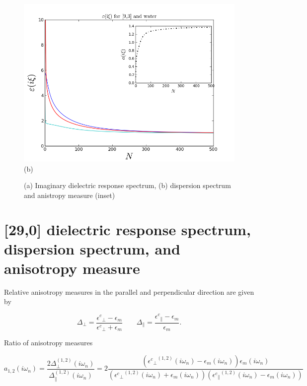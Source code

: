 \documentclass[a4paper]{article}
\begin{document}
\begin{center}
\begin{figure}[t!]
\begin{center}
\begin{minipage}[b]{0.40\textwidth}
\end{minipage}
\hskip 43pt
\begin{minipage}[b]{0.40\textwidth}
\begin{center}
\includegraphics[width=1.4\textwidth]{prop_plots/93w93_eiz.png} (b)
\end{center}
\end{minipage}
\caption{(a) Imaginary dielectric response spectrum, (b) dispersion spectrum and anistropy measure (inset)}
\label{eiz91}
\end{center}
\end{figure} 

\section{[29,0] dielectric response spectrum, dispersion spectrum, and anisotropy measure}
Relative anisotropy measures in the parallel and perpendicular direction are given by

\begin{equation}
\Delta_{\perp}=\frac{{\epsilon^{c}}_{\perp}-\epsilon_{m}}{{\epsilon^{c}}_{\perp}+\epsilon_{m}}\qquad\Delta_{\parallel}=\frac{{\epsilon^{c}}_{\parallel}-\epsilon_{m}}{\epsilon_{m}}.
\label{anisoind}
\end{equation}

Ratio of anisotropy measures

\begin{equation}
a_{1,2}(i \omega_n) = \frac{2 \Delta_{\perp}^{(1,2)}(i \omega_n)}{\Delta_{\parallel}^{(1,2)}(i \omega_n)} = 2 \frac{({{\epsilon^{c}}_{\perp}}^{(1,2)}(i \omega_n) -\epsilon_{m}(i \omega_n)) \epsilon_{m}(i \omega_n)}{({{\epsilon^{c}}_{\perp}}^{(1,2)}(i \omega_n)+\epsilon_{m}(i \omega_n)) ({{\epsilon^{c}}_{\parallel}}^{(1,2)}(i \omega_n) -\epsilon_{m}(i \omega_n))}
\label{eq:adef}
\end{equation}


\end{center}
\end{document}
